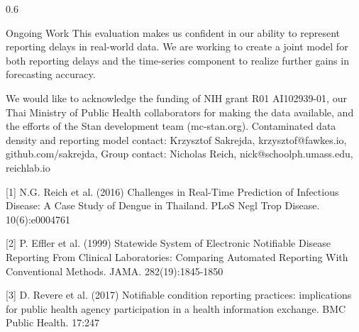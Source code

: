 \documentclass[final]{beamer}
\newlength{\onecolwid}
\begin{document}
\begin{frame}[t]
\begin{columns}[t]
\begin{column}{0.6\onecolwid}



\begin{block}{Ongoing Work}
This evaluation makes us confident in our ability to represent reporting delays in real-world data.  We are working to create a joint model for both reporting delays and the time-series component to realize further gains in forecasting accuracy.
\end{block}


\tiny{We would like to acknowledge the funding of NIH grant R01 AI102939-01, our Thai Ministry of Public Health collaborators for making the data available, and the efforts of the Stan development team (mc-stan.org).} \tiny{Contaminated data density and reporting model contact: Krzysztof Sakrejda, krzysztof@fawkes.io, github.com/sakrejda, Group contact: Nicholas Reich, nick@schoolph.umass.edu, reichlab.io}

\vspace{.2in}


\tiny [1] N.G. Reich et al. (2016) Challenges in Real-Time Prediction of Infectious Disease: A Case Study of Dengue in Thailand. PLoS Negl Trop Disease. 10(6):e0004761  

\tiny [2] P. Effler et al. (1999) Statewide System of Electronic Notifiable Disease Reporting From Clinical Laboratories: Comparing Automated Reporting With Conventional Methods. JAMA. 282(19):1845-1850  

\tiny [3] D. Revere et al. (2017) Notifiable condition reporting practices: implications for public health agency participation in a health information exchange. BMC Public Health. 17:247

\end{column}


\end{columns} %


\end{frame} %
\end{document}
